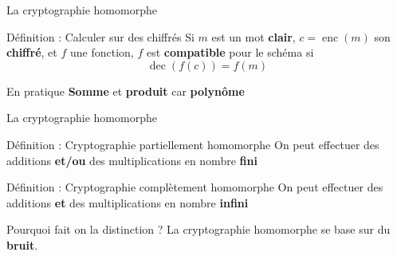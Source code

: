 \begin{frame}{La cryptographie homomorphe}

\begin{alertblock}{Définition : Calculer sur des chiffrés}
Si $m$ est un mot \textbf{clair}, $c = \operatorname{enc}(m)$ son \textbf{chiffré}, et $f$ une fonction, $f$ est \textbf{compatible} pour le schéma si
    $$\operatorname{dec}(f(c)) = f(m)$$
\end{alertblock}

\begin{alertblock}{En pratique} %
\textbf{Somme} et \textbf{produit} car \textbf{polynôme}
\end{alertblock}
    
\end{frame}

\begin{frame}{La cryptographie homomorphe}

\begin{alertblock}{Définition : Cryptographie partiellement homomorphe}
On peut effectuer des additions \textbf{et/ou} des multiplications en nombre \textbf{fini}
\end{alertblock}

\begin{alertblock}{Définition : Cryptographie complètement homomorphe}
On peut effectuer des additions \textbf{et} des multiplications en nombre \textbf{infini} 
\end{alertblock}

\begin{alertblock}{Pourquoi fait on la distinction ?}
La cryptographie homomorphe se base sur du \textbf{bruit}.
\end{alertblock}

\end{frame}

